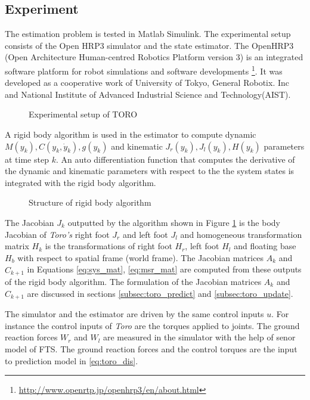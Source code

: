 \subsection{Experiment}
The estimation problem is tested in Matlab Simulink. The experimental setup consists of the Open HRP3 simulator and the state estimator. The OpenHRP3 (Open Architecture Human-centred Robotics Platform version 3) is an integrated software platform for robot simulations and software developments \footnote{\url{http://www.openrtp.jp/openhrp3/en/about.html}}. It was developed as a cooperative work of University of Tokyo, General Robotix. Inc and National Institute of Advanced Industrial Science and Technology(AIST).

\begin{figure}
    \centering
    
    \caption{Experimental setup of TORO}
\end{figure}

A rigid body algorithm is used in the estimator to compute dynamic $M(y_k), C(y_k,\dot y_k), g(y_k)$ and kinematic $J_r(y_k), J_l(y_k), H(y_k)$ parameters at time step $k$. An auto differentiation function that computes the derivative of the dynamic and kinematic parameters with respect to the the system states is integrated with the rigid body algorithm. 
\begin{figure}[h]
    \centering
    
    \caption{Structure of rigid body algorithm}
    \label{fig:luc_dyn}
\end{figure}
The Jacobian $J_k$ outputted by the algorithm shown in Figure \ref{fig:luc_dyn} is the body Jacobian of \emph{Toro's} right foot $J_r$ and left foot $J_l$ and homogeneous transformation matrix $H_k$ is the transformations of right foot $H_r$, left foot $H_l$ and floating base $H_b$ with respect to spatial frame (world frame).
The Jacobian matrices $A_k$ and $\hat C_{k+1}$ in Equations \ref{eq:sys_mat}, \ref{eq:msr_mat} are computed from these outputs of the rigid body algorithm. The formulation of the Jacobian matrices $A_k$ and $\hat C_{k+1}$ are discussed in sections \ref{subsec:toro_predict} and \ref{subsec:toro_update}. 

The simulator and the estimator are driven by the same control inputs $u$. For instance the control inputs of \emph{Toro} are the torques applied to joints. The ground reaction forces $W_r$ and $W_l$ are measured in the simulator with the help of senor model of FTS. The ground reaction forces and the control torques are the input to prediction model in \ref{eq:toro_dis}.

